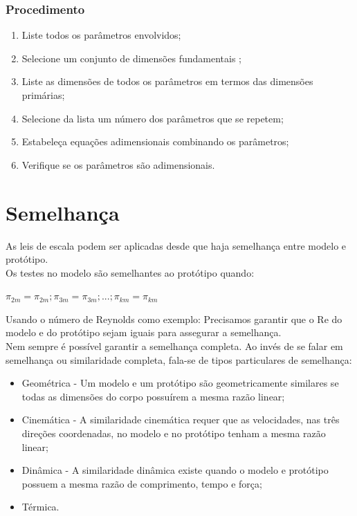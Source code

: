 \documentclass[a4paper, 12pt]{article}
\begin{document}
\subsubsection{Procedimento}
	\begin{enumerate}
		\item Liste todos os parâmetros envolvidos;
		\item Selecione um conjunto de dimensões fundamentais ;
		\item Liste as dimensões de todos os parâmetros em termos das dimensões primárias;
		\item Selecione da lista um número dos parâmetros que se repetem;
		\item Estabeleça equações adimensionais combinando os parâmetros;
		\item Verifique se os parâmetros são adimensionais.
	\end{enumerate}

\section{Semelhança}
	As leis de escala podem ser aplicadas desde que haja semelhança entre modelo e protótipo.\\
	
	Os testes no modelo são semelhantes ao protótipo quando:
	\begin{center}
		\Large
		$
		\pi_{2m} = \pi_{2m};\pi_{3m} = \pi_{3m};...;\pi_{km} = \pi_{km}
		$
	\end{center}
	Usando o número de Reynolds como exemplo: Precisamos garantir que o Re do modelo e do protótipo sejam iguais para assegurar a semelhança.\\
	
	Nem sempre é possível garantir a semelhança completa.
	Ao invés de se falar em semelhança ou similaridade completa, fala-se de tipos particulares de semelhança:
	\begin{itemize}
		\item Geométrica - Um modelo e um protótipo são geometricamente similares se todas as dimensões do corpo possuírem a mesma razão linear;
		\item Cinemática - A similaridade cinemática requer que as velocidades, nas três direções coordenadas, no modelo e no protótipo tenham a mesma razão linear;
		\item Dinâmica - A  similaridade dinâmica existe quando o modelo e protótipo possuem a mesma razão de comprimento, tempo e força;
		\item Térmica.
	\end{itemize}
\end{document}
